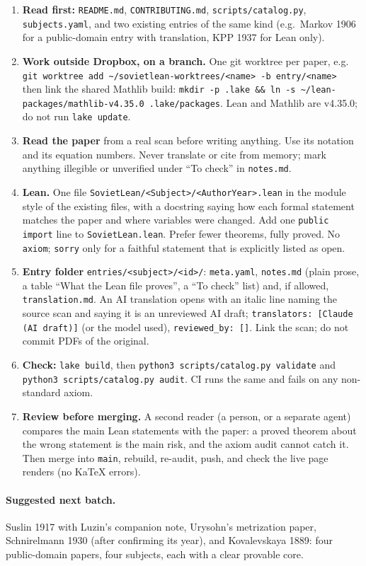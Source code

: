 \documentclass[11pt]{article}
\begin{document}
\begin{enumerate}
\item \textbf{Read first:} \texttt{README.md}, \texttt{CONTRIBUTING.md}, \texttt{scripts/catalog.py}, \texttt{subjects.yaml}, and two existing entries of the same kind (e.g.\ Markov 1906 for a public-domain entry with translation, KPP 1937 for Lean only).
\item \textbf{Work outside Dropbox, on a branch.} One git worktree per paper, e.g.\\
\texttt{git worktree add \textasciitilde/sovietlean-worktrees/<name> -b entry/<name>}\\
then link the shared Mathlib build: \texttt{mkdir -p .lake \&\& ln -s \textasciitilde/lean-packages/mathlib-v4.35.0 .lake/packages}. Lean and Mathlib are v4.35.0; do not run \texttt{lake update}.
\item \textbf{Read the paper} from a real scan before writing anything. Use its notation and its equation numbers. Never translate or cite from memory; mark anything illegible or unverified under ``To check'' in \texttt{notes.md}.
\item \textbf{Lean.} One file \texttt{SovietLean/<Subject>/<AuthorYear>.lean} in the module style of the existing files, with a docstring saying how each formal statement matches the paper and where variables were changed. Add one \texttt{public import} line to \texttt{SovietLean.lean}. Prefer fewer theorems, fully proved. No \texttt{axiom}; \texttt{sorry} only for a faithful statement that is explicitly listed as open.
\item \textbf{Entry folder} \texttt{entries/<subject>/<id>/}: \texttt{meta.yaml}, \texttt{notes.md} (plain prose, a table ``What the Lean file proves'', a ``To check'' list) and, if allowed, \texttt{translation.md}. An AI translation opens with an italic line naming the source scan and saying it is an unreviewed AI draft; \texttt{translators: [Claude (AI draft)]} (or the model used), \texttt{reviewed\_by: []}. Link the scan; do not commit PDFs of the original.
\item \textbf{Check:} \texttt{lake build}, then \texttt{python3 scripts/catalog.py validate} and \texttt{python3 scripts/catalog.py audit}. CI runs the same and fails on any non-standard axiom.
\item \textbf{Review before merging.} A second reader (a person, or a separate agent) compares the main Lean statements with the paper: a proved theorem about the wrong statement is the main risk, and the axiom audit cannot catch it. Then merge into \texttt{main}, rebuild, re-audit, push, and check the live page renders (no KaTeX errors).
\end{enumerate}

\paragraph{Suggested next batch.} Suslin 1917 with Luzin's companion note, Urysohn's metrization paper, Schnirelmann 1930 (after confirming its year), and Kovalevskaya 1889: four public-domain papers, four subjects, each with a clear provable core.
\end{document}
